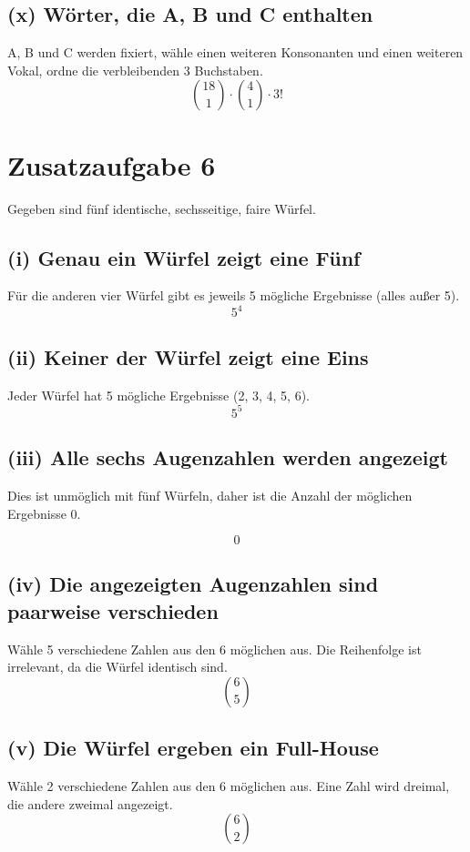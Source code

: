 \documentclass{article}
\begin{document}
\subsection*{(x) Wörter, die A, B und C enthalten}
A, B und C werden fixiert, wähle einen weiteren Konsonanten und einen weiteren Vokal, ordne die verbleibenden 3 Buchstaben.
\[
	\binom{18}{1} \cdot \binom{4}{1} \cdot 3!
\]

\section*{Zusatzaufgabe 6}

Gegeben sind fünf identische, sechsseitige, faire Würfel.

\subsection*{(i) Genau ein Würfel zeigt eine Fünf}
Für die anderen vier Würfel gibt es jeweils 5 mögliche Ergebnisse (alles außer 5).
\[
	5^4
\]

\subsection*{(ii) Keiner der Würfel zeigt eine Eins}
Jeder Würfel hat 5 mögliche Ergebnisse (2, 3, 4, 5, 6).
\[
	5^5
\]

\subsection*{(iii) Alle sechs Augenzahlen werden angezeigt}
Dies ist unmöglich mit fünf Würfeln, daher ist die Anzahl der möglichen Ergebnisse 0.

\[
	0
\]

\subsection*{(iv) Die angezeigten Augenzahlen sind paarweise verschieden}
Wähle 5 verschiedene Zahlen aus den 6 möglichen aus. Die Reihenfolge ist irrelevant, da die Würfel identisch sind.
\[
	\binom{6}{5}
\]

\subsection*{(v) Die Würfel ergeben ein Full-House}
Wähle 2 verschiedene Zahlen aus den 6 möglichen aus. Eine Zahl wird dreimal, die andere zweimal angezeigt.
\[
	\binom{6}{2}
\]
\end{document}
